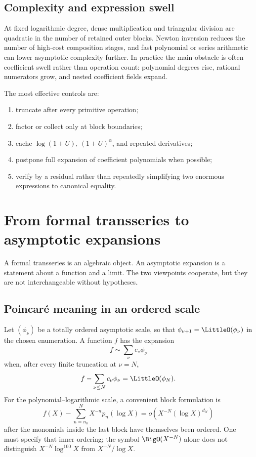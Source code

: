 \documentclass[11pt,oneside]{book}
\theoremstyle{definition}
\theoremstyle{remark}
\begin{document}
\section{Complexity and expression swell}
At fixed logarithmic degree, dense multiplication and triangular division
are quadratic in the number of retained outer blocks. Newton inversion
reduces the number of high-cost composition stages, and fast polynomial or
series arithmetic can lower asymptotic complexity further. In practice the
main obstacle is often coefficient swell rather than operation count:
polynomial degrees rise, rational numerators grow, and nested coefficient
fields expand.

The most effective controls are:
\begin{enumerate}
\item truncate after every primitive operation;
\item factor or collect only at block boundaries;
\item cache $\log(1+U)$, $(1+U)^\alpha$, and repeated derivatives;
\item postpone full expansion of coefficient polynomials when possible;
\item verify by a residual rather than repeatedly simplifying two enormous
      expressions to canonical equality.
\end{enumerate}


\chapter{From formal transseries to asymptotic expansions}
\label{ch:analytic-meaning}

A formal transseries is an algebraic object. An asymptotic expansion is a
statement about a function and a limit. The two viewpoints cooperate, but
they are not interchangeable without hypotheses.

\section{Poincar\'e meaning in an ordered scale}
Let $(\phi_\nu)$ be a totally ordered asymptotic scale, so that
$\phi_{\nu+1}=\LittleO(\phi_\nu)$ in the chosen enumeration. A function $f$ has
the expansion
\[
 f\sim\sum_{\nu}c_\nu\phi_\nu
\]
when, after every finite truncation at $\nu=N$,
\[
 f-\sum_{\nu\le N}c_\nu\phi_\nu=\LittleO(\phi_N).
\]
For the polynomial--logarithmic scale, a convenient block formulation is
\begin{equation}\label{eq:block-asymptotic-analytic}
 f(X)-\sum_{n=n_0}^{N}X^{-n}p_n(\log X)
 =o\!\left(X^{-N}(\log X)^{d_N}\right)
\end{equation}
after the monomials inside the last block have themselves been ordered.
One must specify that inner ordering; the symbol $\BigO(X^{-N})$ alone does
not distinguish $X^{-N}\log^{100}X$ from $X^{-N}/\log X$.
\end{document}
